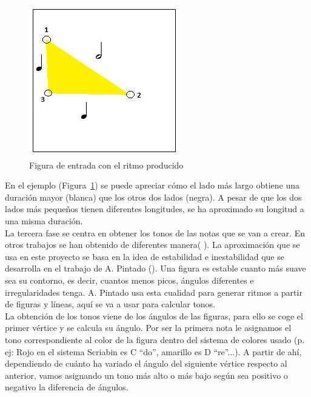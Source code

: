 		\begin{figure}[htbp]
		\centering
		\hspace*{0.0in}
		\includegraphics[scale=1.0]{graphics/simpletest1-F2.png}
		\caption{Figura de entrada con el ritmo producido}
		\label{fig:Figura2Voz1}
		\end{figure}

En el ejemplo (Figura~\ref{fig:Figura2Voz1}) se puede apreciar cómo el lado más largo obtiene una duración mayor (blanca) que los otros dos lados (negra). A pesar de que los dos lados más pequeños tienen diferentes longitudes, se ha aproximado su longitud a una misma duración.\\

La tercera fase se centra en obtener los tonos de las notas que se van a crear. En otros trabajos se han obtenido de diferentes manera(\cite{bricksConvertsMusic} \cite{ImageBaseComposition}). La aproximación que se usa en este proyecto se basa en la idea de estabilidad e inestabilidad que se desarrolla en el trabajo de A. Pintado (\cite{portutesis}). Una figura es estable cuanto más suave sea su contorno, es decir, cuantos menos picos, ángulos diferentes e irregularidades tenga. A. Pintado usa esta cualidad para generar ritmos a partir de figuras y líneas, aquí se va a usar para calcular tonos.\\

La obtención de los tonos viene de los ángulos de las figuras, para ello se coge el primer vértice y se calcula su ángulo. Por ser la primera nota le asignamos el tono correspondiente al color de la figura dentro del sistema de colores usado (p. ej: Rojo en el sistema Scriabin es C ``do'', amarillo es D ``re''...). A partir de ahí, dependiendo de cuánto ha variado el ángulo del siguiente vértice respecto al anterior, vamos asignando un tono más alto o más bajo según sea positivo o negativo la diferencia de ángulos.

